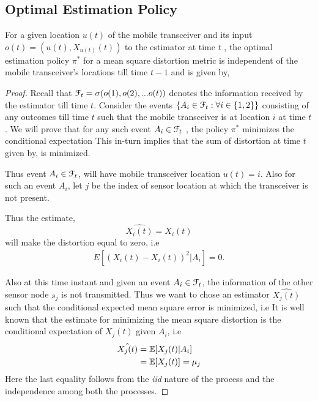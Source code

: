\documentclass[a4paper,english,12pt]{article}
\begin{document}
\subsection{Optimal Estimation Policy}
\begin{thm}\label{theta}
For a given location $u(t)$ of the mobile transceiver and its input \\ $o(t)=(u(t), X_{u(t)}(t))$ to the estimator at time $t$ , the optimal estimation policy $\pi^*$ for a mean square distortion metric is independent  of the mobile transceiver's locations till time $t-1$  and is given by,

\end{thm}
\begin{proof}


Recall that  $\mathcal{F}_t=\sigma(o(1),o(2),... o(t))$ denotes the information received by the estimator till time $t$. Consider the events   $\{A_i \in \mathcal{F}_t : \forall i \in \{1,2\}\}$  consisting of any outcomes till time $t$ such that  the  mobile transceiver is at location $i$ at time $t$.
 We will prove that for any such event $A_i \in \mathcal{F}_t$ , the  policy $\pi^*$ minimizes the conditional expectation  This in-turn implies that the sum of distortion at time $t$  given by,  is minimized.

Thus event $A_i \in \mathcal{F}_t$, will have mobile transceiver location $u(t)=i$. Also for such an event $A_i$, let $j$ be the index of sensor location at which the transceiver is not present.

 Thus the estimate, 
 \begin{equation}
 \hat{X_i(t)}= X_i(t) 
 \end{equation}
  will make the distortion equal to zero, i.e \begin{align}\label{mse_0}
  E[(X_i(t)-X_i(t))^2|A_i]=0.
  \end{align}

Also at this time instant  and given an event $A_i \in \mathcal{F}_t$, the information of the other sensor node $s_j$ is not transmitted. Thus we want to chose an estimator $\hat{X_{j}(t)}$ such that the conditional expected mean square error is minimized, i.e
  It is well known that the estimate for minimizing the mean square distortion is the conditional expectation of $X_j(t)$ given $A_i$, i.e 
\begin{align}\label{mse}\hat{X_{j}(t)}&=\mathbb{E}[X_{j}(t)|A_i] \nonumber\\
&=\mathbb{E}[X_{j}(t)]=\mu_j
\end{align}
Here the last equality follows from the \textit{iid} nature of the process and the independence among both the processes.
\end{proof}
\end{document}
